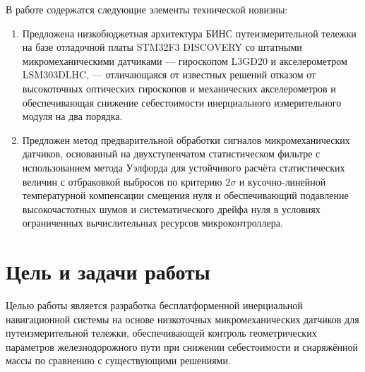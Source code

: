 В работе содержатся следующие элементы технической новизны:
\begin{enumerate}
	\item Предложена низкобюджетная архитектура БИНС путеизмерительной тележки на базе отладочной платы STM32F3 DISCOVERY со штатными микромеханическими датчиками --- гироскопом L3GD20 и акселерометром LSM303DLHC, --- отличающаяся от известных решений отказом от высокоточных оптических гироскопов и механических акселерометров и обеспечивающая снижение себестоимости инерциального измерительного модуля на два порядка.
	\item Предложен метод предварительной обработки сигналов микромеханических датчиков, основанный на двухступенчатом статистическом фильтре с использованием метода Уэлфорда для устойчивого расчёта статистических величин с отбраковкой выбросов по критерию $2\sigma$ и кусочно-линейной температурной компенсации смещения нуля и обеспечивающий подавление высокочастотных шумов и систематического дрейфа нуля в условиях ограниченных вычислительных ресурсов микроконтроллера.
\end{enumerate}

\section*{Цель и задачи работы}

Целью работы является разработка бесплатформенной инерциальной навигационной системы на основе низкоточных микромеханических датчиков для путеизмерительной тележки, обеспечивающей контроль геометрических параметров железнодорожного пути при снижении себестоимости и снаряжённой массы по сравнению с существующими решениями.

